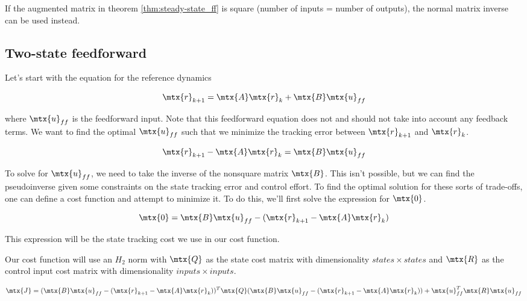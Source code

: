 If the augmented matrix in theorem \ref{thm:steady-state_ff} is square (number
of \glspl{input} = number of \glspl{output}), the normal matrix inverse can be
used instead.

\subsection{Two-state feedforward}
\label{subsec:two-state_feedforward}

Let's start with the equation for the \gls{reference} dynamics

\begin{equation*}
  \mtx{r}_{k+1} = \mtx{A}\mtx{r}_k + \mtx{B}\mtx{u}_{ff}
\end{equation*}

where $\mtx{u}_{ff}$ is the feedforward input. Note that this feedforward
equation does not and should not take into account any feedback terms. We want
to find the optimal $\mtx{u}_{ff}$ such that we minimize the \gls{tracking}
error between $\mtx{r}_{k+1}$ and $\mtx{r}_k$.

\begin{equation*}
  \mtx{r}_{k+1} - \mtx{A}\mtx{r}_k = \mtx{B}\mtx{u}_{ff}
\end{equation*}

To solve for $\mtx{u}_{ff}$, we need to take the inverse of the nonsquare matrix
$\mtx{B}$. This isn't possible, but we can find the pseudoinverse given some
constraints on the \gls{state} \gls{tracking} error and \gls{control effort}. To
find the optimal solution for these sorts of trade-offs, one can define a cost
function and attempt to minimize it. To do this, we'll first solve the
expression for $\mtx{0}$.

\begin{equation*}
  \mtx{0} = \mtx{B}\mtx{u}_{ff} - (\mtx{r}_{k+1} - \mtx{A}\mtx{r}_k)
\end{equation*}

This expression will be the \gls{state} \gls{tracking} cost we use in our cost
function.

Our cost function will use an $H_2$ norm with $\mtx{Q}$ as the \gls{state} cost
matrix with dimensionality $states \times states$ and $\mtx{R}$ as the
\gls{control input} cost matrix with dimensionality $inputs \times inputs$.

\begin{equation*}
  \mtx{J} = (\mtx{B}\mtx{u}_{ff} - (\mtx{r}_{k+1} - \mtx{A}\mtx{r}_k))^T \mtx{Q}
    (\mtx{B}\mtx{u}_{ff} - (\mtx{r}_{k+1} - \mtx{A}\mtx{r}_k)) +
    \mtx{u}_{ff}^T\mtx{R}\mtx{u}_{ff}
\end{equation*}

